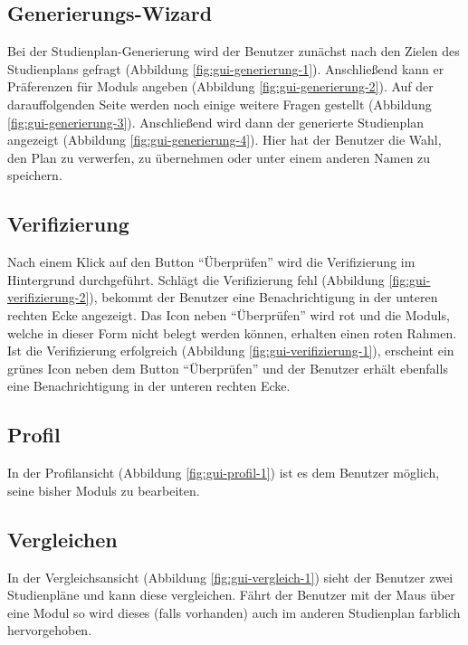 \subsection{Generierungs-Wizard}
\label{subsec:gui-generierung}
Bei der Studienplan-Generierung wird der \gls{Benutzer} zunächst nach den Zielen des Studienplans gefragt (Abbildung \ref{fig:gui-generierung-1}). Anschließend kann er Präferenzen für \glspl{Modul} angeben (Abbildung \ref{fig:gui-generierung-2}). Auf der darauffolgenden Seite werden noch einige weitere Fragen gestellt (Abbildung \ref{fig:gui-generierung-3}). Anschließend wird dann der generierte Studienplan angezeigt (Abbildung \ref{fig:gui-generierung-4}). Hier hat der \gls{Benutzer} die Wahl, den Plan zu verwerfen, zu übernehmen oder unter einem anderen Namen zu speichern.


\subsection{Verifizierung}
\label{subsec:gui-verifizierung}
Nach einem Klick auf den Button \enquote{Überprüfen} wird die Verifizierung im Hintergrund durchgeführt.\newline
Schlägt die Verifizierung fehl (Abbildung \ref{fig:gui-verifizierung-2}), bekommt der \gls{Benutzer} eine Benachrichtigung in der unteren rechten Ecke angezeigt. Das Icon neben \enquote{Überprüfen} wird rot und die \glspl{Modul}, welche in dieser Form nicht belegt werden können, erhalten einen roten Rahmen.\newline
Ist die Verifizierung erfolgreich (Abbildung \ref{fig:gui-verifizierung-1}), erscheint ein grünes Icon neben dem Button \enquote{Überprüfen} und der \gls{Benutzer} erhält ebenfalls eine Benachrichtigung in der unteren rechten Ecke.


\subsection{Profil}
In der Profilansicht (Abbildung \ref{fig:gui-profil-1}) ist es dem Benutzer möglich, seine bisher  \glspl{Modul} zu bearbeiten.

\subsection{Vergleichen}
In der Vergleichsansicht (Abbildung \ref{fig:gui-vergleich-1}) sieht der \gls{Benutzer} zwei Studienpläne und kann diese vergleichen. Fährt der Benutzer mit der Maus über eine Modul so wird dieses (falls vorhanden) auch im anderen Studienplan farblich hervorgehoben.
